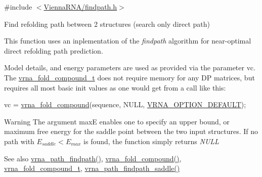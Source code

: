 {\ttfamily \#include $<$\hyperlink{findpath_8h}{Vienna\+R\+N\+A/findpath.\+h}$>$}



Find refolding path between 2 structures (search only direct path) 

This function uses an inplementation of the {\itshape findpath} algorithm \cite{flamm:2001} for near-\/optimal direct refolding path prediction.

Model details, and energy parameters are used as provided via the parameter \textquotesingle{}vc\textquotesingle{}. The \hyperlink{group__fold__compound_ga1b0cef17fd40466cef5968eaeeff6166}{vrna\+\_\+fold\+\_\+compound\+\_\+t} does not require memory for any DP matrices, but requires all most basic init values as one would get from a call like this\+: 
\begin{DoxyCode}
vc = \hyperlink{group__fold__compound_ga6601d994ba32b11511b36f68b08403be}{vrna\_fold\_compound}(sequence, NULL, \hyperlink{group__fold__compound_gacea5b7ee6181c485f36e2afa0e9089e4}{VRNA\_OPTION\_DEFAULT});
\end{DoxyCode}


\begin{DoxyWarning}{Warning}
The argument {\ttfamily maxE} enables one to specify an upper bound, or maximum free energy for the saddle point between the two input structures. If no path with $E_{saddle} < E_{max}$ is found, the function simply returns {\itshape N\+U\+LL} 
\end{DoxyWarning}
\begin{DoxySeeAlso}{See also}
\hyperlink{group__direct__paths_ga4b2283c4142cafd99678495585fcc842}{vrna\+\_\+path\+\_\+findpath()}, \hyperlink{group__fold__compound_ga6601d994ba32b11511b36f68b08403be}{vrna\+\_\+fold\+\_\+compound()}, \hyperlink{group__fold__compound_ga1b0cef17fd40466cef5968eaeeff6166}{vrna\+\_\+fold\+\_\+compound\+\_\+t}, \hyperlink{group__direct__paths_gad611574a76593e26021f177e7854b6b4}{vrna\+\_\+path\+\_\+findpath\+\_\+saddle()}
\end{DoxySeeAlso}

